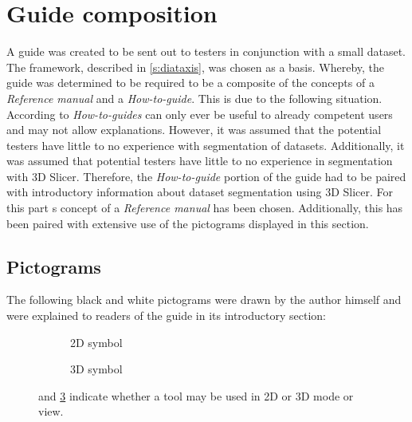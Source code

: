 \section{Guide composition}\label{s:guide_comp}
A guide was created to be sent out to testers in conjunction with a small dataset.
The \diatx\space framework, described in \cref{s:diataxis}, was chosen as a basis.
Whereby, the guide was determined to be required to be a composite of the \diatx\space concepts of a
\textit{Reference manual} and a \textit{How-to-guide}.
This is due to the following situation.
According to \citeauthor{procidaDiataxisDocumentationFramework2023} \textit{How-to-guides} can only ever be useful to already competent users and may not allow explanations.
However, it was assumed that the potential testers have little to no experience with segmentation of \mct\space datasets.
Additionally, it was assumed that potential testers have little to no experience in segmentation with 3D Slicer.
Therefore, the \textit{How-to-guide} portion of the guide had to be paired with introductory information about \mct\space dataset segmentation using 3D Slicer.
For this part \citeauthor{procidaDiataxisDocumentationFramework2023}s \diatx\space concept of a \textit{Reference manual} has been chosen.
Additionally, this has been paired with extensive use of the pictograms displayed in this section.


\subsection*{Pictograms}\label{s:mm-pictograms}
The following black and white pictograms were drawn by the author himself and were explained to readers of the guide in its introductory section:
\newline
\begin{figure}[h!]
	\begin{centering}
		\begin{subfigure}{0.5\textwidth}
			
			\caption{2D symbol}\label{fig:2d_icon}
		\end{subfigure}
		\begin{subfigure}{0.5\textwidth}
			
			\caption{3D symbol}\label{fig:3d_icon}
		\end{subfigure}
	\end{centering}
	\caption{ and \cref{fig:3d_icon} indicate whether a tool may be used in 2D or 3D mode or view.}
\end{figure}

